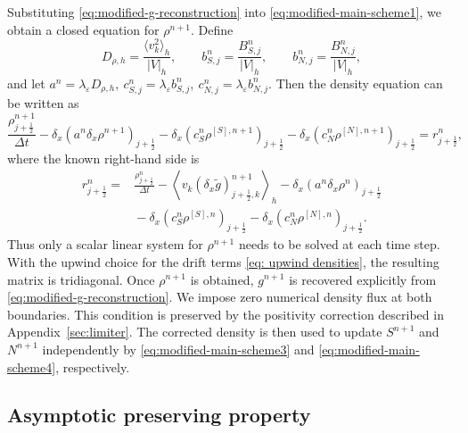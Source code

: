 \documentclass[11pt,twoside]{article}
\numberwithin{equation}{section}
\theoremstyle{plain}
\theoremstyle{nonumberplain}
\begin{document}
{Substituting \eqref{eq:modified-g-reconstruction} into  \eqref{eq:modified-main-scheme1}, we obtain a closed equation for
\(\rho^{n+1}\). Define
\[
D_{\rho,h}
=
\frac{\langle v_k^2\rangle_h}{|V|_h},
\qquad
b_{S,j}^n
=
\frac{B_{S,j}^n}{|V|_h},
\qquad
b_{N,j}^n
=
\frac{B_{N,j}^n}{|V|_h},
\]
and let
$
a^n=\lambda_\varepsilon D_{\rho,h},
\
c_{S,j}^n=\lambda_\varepsilon b_{S,j}^n,
\
c_{N,j}^n=\lambda_\varepsilon b_{N,j}^n.
$
Then the density equation can be written as
\begin{equation}\label{eq:modified-rho-equation-two-upwind}
\frac{\rho_{j+\frac12}^{n+1}}{\Delta t}
-
\delta_x\left(
a^n\delta_x\rho^{n+1}
\right)_{j+\frac12}
-
\delta_x\left(
c_S^n\rho^{[S],n+1}
\right)_{j+\frac12}
-
\delta_x\left(
c_N^n\rho^{[N],n+1}
\right)_{j+\frac12}
=
r_{j+\frac12}^n,
\end{equation}
where the known right-hand side is
\[
\begin{aligned}
r_{j+\frac12}^n
=&
\frac{\rho_{j+\frac12}^n}{\Delta t}
-
\left\langle
v_k(\delta_x\widetilde g)_{j+\frac12,k}^{n+1}
\right\rangle_h
-
\delta_x\left(
a^n\delta_x\rho^n
\right)_{j+\frac12}
\\ &{}-
\delta_x\left(
c_S^n\rho^{[S],n}
\right)_{j+\frac12}
-
\delta_x\left(
c_N^n\rho^{[N],n}
\right)_{j+\frac12}.
\end{aligned}
\]
Thus only a scalar linear system for \(\rho^{n+1}\) needs to be solved at
each time step. With the upwind choice for the drift terms \eqref{eq: upwind densities}, the
resulting matrix is tridiagonal. Once \(\rho^{n+1}\) is obtained,
\(g^{n+1}\) is recovered explicitly from
\eqref{eq:modified-g-reconstruction}. 
We impose zero numerical density flux at both boundaries.
This condition is preserved by the positivity correction
described in Appendix~\ref{sec:limiter}.
The corrected density is then used to update $S^{n+1}$ and $N^{n+1}$
independently by \eqref{eq:modified-main-scheme3} and
\eqref{eq:modified-main-scheme4}, respectively.



\subsection{Asymptotic preserving property}

}
\end{document}
